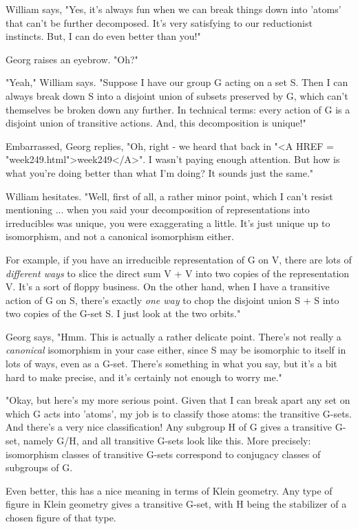 William says, "Yes, it's always fun when we can break things down
into 'atoms' that can't be further decomposed.  It's very satisfying
to our reductionist instincts.  But, I can do even better than you!"

Georg raises an eyebrow.  "Oh?"

"Yeah," William says.  "Suppose I have our group G acting on a set S.
Then I can always break down S into a disjoint union of subsets 
preserved by G, which can't themselves be broken down any further.  
In technical terms: every action of G is a disjoint union of transitive
actions.  And, this decomposition is unique!"

Embarrassed, Georg replies, "Oh, right - we heard that back in "<A HREF = "week249.html">week249</A>".
I wasn't paying enough attention.  But how is what you're doing better 
than what I'm doing?  It sounds just the same."

William hesitates.  "Well, first of all, a rather minor point, which I can't 
resist mentioning ... when you said your decomposition of representations 
into irreducibles was unique, you were exaggerating a little.  It's just 
unique up to isomorphism, and not a canonical isomorphism either.  

For example, if you have an irreducible representation of G on V, 
there are lots of \emph{different ways} to slice the direct sum V + V 
into two copies of the representation V.   It's a sort of floppy 
business.  On the other hand, when I have a transitive action of G on S, 
there's exactly \emph{one way} to chop the disjoint union S + S into two 
copies of the G-set S.  I just look at the two orbits."

Georg says, "Hmm.  This is actually a rather delicate point.  
There's not really a \emph{canonical} isomorphism in your case either, 
since S may be isomorphic to itself in lots of ways, even as a G-set.
There's something in what you say, but it's a bit hard to make 
precise, and it's certainly not enough to worry me."

"Okay, but here's my more serious point.  Given that
I can break apart any set on which G acts into 'atoms', my job is
to classify those atoms: the transitive G-sets.  And there's a very
nice classification!  Any subgroup H of G gives a transitive G-set, 
namely G/H, and all transitive G-sets look like this.  More precisely:
isomorphism classes of transitive G-sets correspond to conjugacy 
classes of subgroups of G.  

Even better, this has a nice meaning in terms of Klein geometry.
Any type of figure in Klein geometry gives a transitive G-set, 
with H being the stabilizer of a chosen figure of that type.

